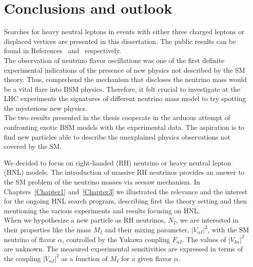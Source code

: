 
\chapter{Conclusions and outlook}\label{Chapter7} 

Searches for heavy neutral leptons in events with either three
charged leptons or displaced vertices are presented in this dissertation. The public
results can be found in References~\cite{Sirunyan:2018mtv} and~\cite{CMS-PAS-EXO-20-009} respectively.\\


The observation of neutrino flavor oscillations was one of the first 
definite experimental indications of the
presence of new physics not described by the SM theory. Thus, 
comprehend the mechanism that discloses the neutrino mass would be a
vital flare into BSM physics. Therefore, it felt crucial to investigate at the LHC
experiments the signatures of different neutrino mass model to try spotting the mysterious new physics.\\
The two results presented in the thesis cooperate in the arduous attempt of confronting exotic BSM
models with the experimental data. The aspiration is to find new
particles able to describe the unexplained
physics observations not covered by the SM. 

We decided to focus on right-handed (RH) neutrino or heavy neutral lepton (HNL)
models. The introduction of massive RH
neutrinos provides an answer to the SM problem of the
neutrino masses via seesaw mechanism.  
In Chapters~\ref{Chapter1} and~\ref{Chapter3} we illustrated
the relevance and the interest for the
ongoing HNL search program, describing first the theory setting 
and then mentioning the various experiments and results
focusing on HNL.\\
When we hypothesize a new particle as RH neutrinos, $N_{I}$, we
are interested in their properties like the mass $M_I$ and
their mixing parameter, $|V_{\alpha I}|^2$,  with the SM neutrino of flavor $\alpha$,
controlled by the Yukawa coupling $F_{\alpha I}$. The values of $|V_{I
  \alpha}|^2$ are unknown. The measured experimental
sensitivities are expressed in
terms of the coupling $|V_{\alpha I}|^2$
as a function of $M_I$ for a given flavor $\alpha$. 

